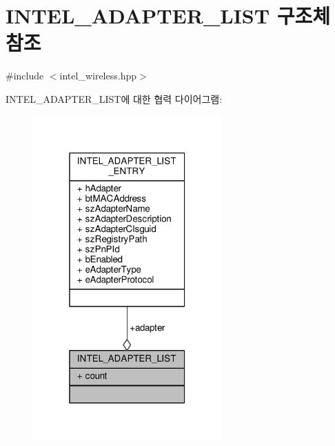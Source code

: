 \hypertarget{struct_i_n_t_e_l___a_d_a_p_t_e_r___l_i_s_t}{}\section{I\+N\+T\+E\+L\+\_\+\+A\+D\+A\+P\+T\+E\+R\+\_\+\+L\+I\+ST 구조체 참조}
\label{struct_i_n_t_e_l___a_d_a_p_t_e_r___l_i_s_t}


{\ttfamily \#include $<$intel\+\_\+wireless.\+hpp$>$}



I\+N\+T\+E\+L\+\_\+\+A\+D\+A\+P\+T\+E\+R\+\_\+\+L\+I\+S\+T에 대한 협력 다이어그램\+:
\nopagebreak
\begin{figure}[H]
\begin{center}
\leavevmode
\includegraphics[width=205pt]{struct_i_n_t_e_l___a_d_a_p_t_e_r___l_i_s_t__coll__graph}
\end{center}
\end{figure}
